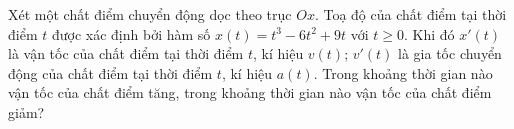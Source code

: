 \begin{ex}%
 Xét một chất điểm chuyển động dọc theo trục $Ox$. Toạ độ của chất điểm tại thời điểm $t$ được xác định bởi hàm số $x(t)=t^3-6t^2+9t$ với $t\geq 0$. Khi đó $x'(t)$ là vận tốc của chất điểm tại thời điểm $t$, kí hiệu $v(t)$; $v'(t)$ là gia tốc chuyển động của chất điểm tại thời điểm $t$, kí hiệu $a(t)$. Trong khoảng thời gian nào vận tốc của chất điểm tăng, trong khoảng thời gian nào vận tốc của chất điểm giảm?
\end{ex}

